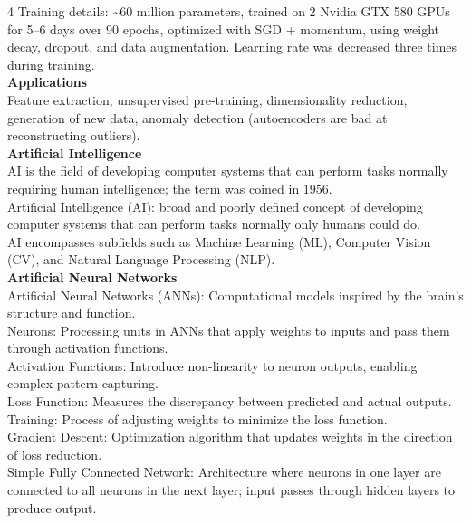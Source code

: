 \documentclass[8pt]{extarticle}
\begin{document}
\begin{multicols}{4}
Training details: \textasciitilde{}60 million parameters, trained on 2 Nvidia GTX 580 GPUs for 5--6 days over 90 epochs, optimized with SGD + momentum, using weight decay, dropout, and data augmentation. Learning rate was decreased three times during training.\\
\vspace{2pt}\textbf{Applications}\\
Feature extraction, unsupervised pre-training, dimensionality reduction, generation of new data, anomaly detection (autoencoders are bad at reconstructing outliers).\\
\vspace{2pt}\textbf{Artificial Intelligence}\\
AI is the field of developing computer systems that can perform tasks normally requiring human intelligence; the term was coined in 1956.\\
Artificial Intelligence (AI): broad and poorly defined concept of developing computer systems that can perform tasks normally only humans could do.\\
AI encompasses subfields such as Machine Learning (ML), Computer Vision (CV), and Natural Language Processing (NLP).\\
\vspace{2pt}\textbf{Artificial Neural Networks}\\
Artificial Neural Networks (ANNs): Computational models inspired by the brain's structure and function.\\
Neurons: Processing units in ANNs that apply weights to inputs and pass them through activation functions.\\
Activation Functions: Introduce non-linearity to neuron outputs, enabling complex pattern capturing.\\
Loss Function: Measures the discrepancy between predicted and actual outputs.\\
Training: Process of adjusting weights to minimize the loss function.\\
Gradient Descent: Optimization algorithm that updates weights in the direction of loss reduction.\\
Simple Fully Connected Network: Architecture where neurons in one layer are connected to all neurons in the next layer; input passes through hidden layers to produce output.\\


\end{multicols}
\end{document}
